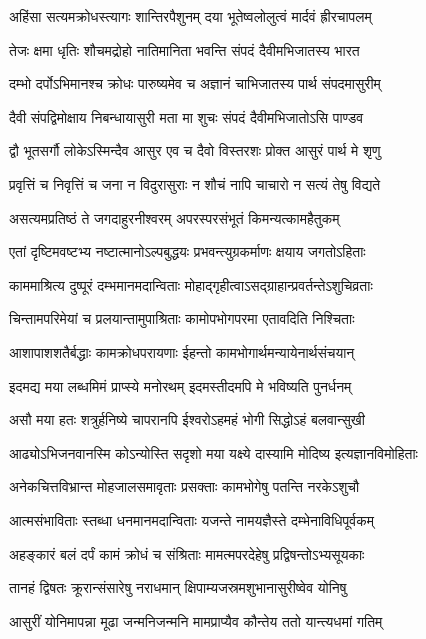 \twolineshloka
{अहिंसा सत्यमक्रोधस्त्यागः शान्तिरपैशुनम्}
{दया भूतेष्वलोलुत्वं मार्दवं ह्रीरचापलम्}


\twolineshloka
{तेजः क्षमा धृतिः शौचमद्रोहो नातिमानिता}
{भवन्ति संपदं दैवीमभिजातस्य भारत}


\twolineshloka
{दम्भो दर्पोऽभिमानश्च क्रोधः पारुष्यमेव च}
{अज्ञानं चाभिजातस्य पार्थ संपदमासुरीम्}


\twolineshloka
{दैवी संपद्विमोक्षाय निबन्धायासुरी मता}
{मा शुचः संपदं दैवीमभिजातोऽसि पाण्डव}


\twolineshloka
{द्वौ भूतसर्गौ लोकेऽस्मिन्दैव आसुर एव च}
{दैवो विस्तरशः प्रोक्त आसुरं पार्थ मे शृणु}


\twolineshloka
{प्रवृत्तिं च निवृत्तिं च जना न विदुरासुराः}
{न शौचं नापि चाचारो न सत्यं तेषु विद्यते}


\twolineshloka
{असत्यमप्रतिष्ठं ते जगदाहुरनीश्वरम्}
{अपरस्परसंभूतं किमन्यत्कामहैतुकम्}


\twolineshloka
{एतां दृष्टिमवष्टभ्य नष्टात्मानोऽल्पबुद्धयः}
{प्रभवन्त्युग्रकर्माणः क्षयाय जगतोऽहिताः}


\twolineshloka
{काममाश्रित्य दुष्पूरं दम्भमानमदान्विताः}
{मोहाद्गृहीत्वाऽसद्ग्राहान्प्रवर्तन्तेऽशुचिव्रताः}


\twolineshloka
{चिन्तामपरिमेयां च प्रलयान्तामुपाश्रिताः}
{कामोपभोगपरमा एतावदिति निश्चिताः}


\twolineshloka
{आशापाशशतैर्बद्धाः कामक्रोधपरायणाः}
{ईहन्तो कामभोगार्थमन्यायेनार्थसंचयान्}


\twolineshloka
{इदमद्य मया लब्धमिमं प्राप्स्ये मनोरथम्}
{इदमस्तीदमपि मे भविष्यति पुनर्धनम्}


\twolineshloka
{असौ मया हतः शत्रुर्हनिष्ये चापरानपि}
{ईश्वरोऽहमहं भोगी सिद्धोऽहं बलवान्सुखी}


\twolineshloka
{आढ्योऽभिजनवानस्मि कोऽन्योस्ति सदृशो मया}
{यक्ष्ये दास्यामि मोदिष्य इत्यज्ञानविमोहिताः}


\twolineshloka
{अनेकचित्तविभ्रान्त मोहजालसमावृताः}
{प्रसक्ताः कामभोगेषु पतन्ति नरकेऽशुचौ}


\twolineshloka
{आत्मसंभाविताः स्तब्धा धनमानमदान्विताः}
{यजन्ते नामयज्ञैस्ते दम्भेनाविधिपूर्वकम्}


\twolineshloka
{अहङ्कारं बलं दर्पं कामं क्रोधं च संश्रिताः}
{मामत्मपरदेहेषु प्रद्विषन्तोऽभ्यसूयकाः}


\twolineshloka
{तानहं द्विषतः क्रूरान्संसारेषु नराधमान्}
{क्षिपाम्यजस्रमशुभानासुरीष्वेव योनिषु}


\twolineshloka
{आसुरीं योनिमापन्ना मूढा जन्मनिजन्मनि}
{मामप्राप्यैव कौन्तेय ततो यान्त्यधमां गतिम्}


